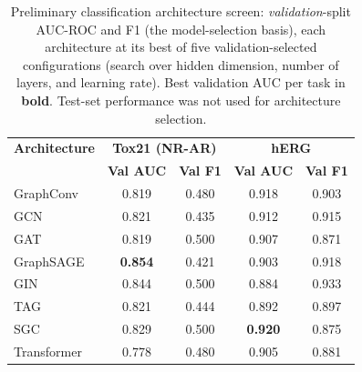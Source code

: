 \documentclass[journal,onecolumn]{IEEEtran}
\begin{document}
\begin{table}[H]
\centering
\caption{Preliminary classification architecture screen: \emph{validation}-split AUC-ROC and F1 (the model-selection basis), each architecture at its best of five validation-selected configurations (search over hidden dimension, number of layers, and learning rate). Best validation AUC per task in \textbf{bold}. Test-set performance was not used for architecture selection.}
\label{tab:arch_classification}
\small
\setlength{\tabcolsep}{4pt}
\begin{tabular}{lcccc}
\toprule
\textbf{Architecture} & \multicolumn{2}{c}{\textbf{Tox21 (NR-AR)}} & \multicolumn{2}{c}{\textbf{hERG}} \\
 & \textbf{Val AUC} & \textbf{Val F1} & \textbf{Val AUC} & \textbf{Val F1} \\
\midrule
GraphConv & 0.819 & 0.480 & 0.918 & 0.903 \\
GCN & 0.821 & 0.435 & 0.912 & 0.915 \\
GAT & 0.819 & 0.500 & 0.907 & 0.871 \\
GraphSAGE & \textbf{0.854} & 0.421 & 0.903 & 0.918 \\
GIN & 0.844 & 0.500 & 0.884 & 0.933 \\
TAG & 0.821 & 0.444 & 0.892 & 0.897 \\
SGC & 0.829 & 0.500 & \textbf{0.920} & 0.875 \\
Transformer & 0.778 & 0.480 & 0.905 & 0.881 \\
\bottomrule
\end{tabular}
\end{table}
\end{document}
